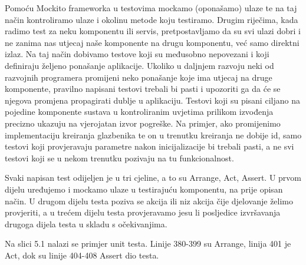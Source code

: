 			Pomoću Mockito frameworka u testovima mockamo (oponašamo) ulaze te na taj način kontroliramo ulaze i okolinu metode koju testiramo. Drugim riječima, kada radimo test za neku komponentu ili servis, pretpostavljamo da su svi ulazi dobri i ne zanima nas utjecaj naše komponente na drugu komponentu, već samo direktni izlaz. Na taj način dobivamo testove koji su međusobno nepovezani i koji definiraju željeno ponašanje aplikacije. Ukoliko u daljnjem razvoju neki od razvojnih programera promijeni neko ponašanje koje ima utjecaj na druge komponente, pravilno napisani testovi trebali bi pasti i upozoriti ga da će se njegova promjena propagirati dublje u aplikaciju. Testovi koji su pisani ciljano na pojedine komponente sustava u kontroliranim uvjetima prilikom izvođenja precizno ukazuju na vjerojatan izvor pogreške. Na primjer, ako promijenimo implementaciju kreiranja glazbenika te on u trenutku kreiranja ne dobije id, samo testovi koji provjeravaju parametre nakon inicijalizacije bi trebali pasti, a ne svi testovi koji se u nekom trenutku pozivaju na tu funkcionalnost.
			
			Svaki napisan test odijeljen je u tri cjeline, a to su Arrange, Act, Assert. U prvom dijelu uređujemo i mockamo ulaze u testirajuću komponentu, na prije opisan način. U drugom dijelu testa poziva se akcija ili niz akcija čije djelovanje želimo provjeriti, a u trećem dijelu testa provjeravamo jesu li posljedice izvršavanja drugoga dijela testa u skladu s očekivanjima.
			
			Na slici 5.1 nalazi se primjer unit testa. Linije 380-399 su Arrange, linija 401 je Act, dok su linije 404-408 Assert dio testa.
			
